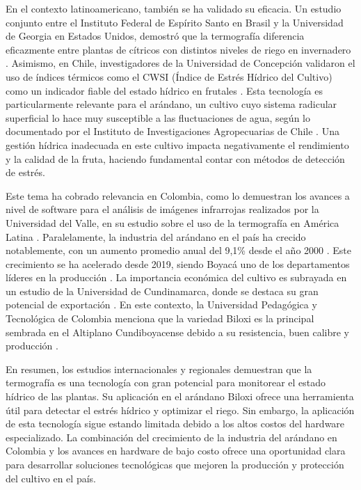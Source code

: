 En el contexto latinoamericano, también se ha validado su eficacia. Un estudio conjunto entre el Instituto Federal de Espírito Santo en Brasil y la Universidad de Georgia en Estados Unidos, demostró que la termografía diferencia eficazmente entre plantas de cítricos con distintos niveles de riego en invernadero . Asimismo, en Chile, investigadores de la Universidad de Concepción validaron el uso de índices térmicos como el CWSI (Índice de Estrés Hídrico del Cultivo) como un indicador fiable del estado hídrico en frutales . Esta tecnología es particularmente relevante para el arándano, un cultivo cuyo sistema radicular superficial lo hace muy susceptible a las fluctuaciones de agua, según lo documentado por el Instituto de Investigaciones Agropecuarias de Chile . Una gestión hídrica inadecuada en este cultivo impacta negativamente el rendimiento y la calidad de la fruta, haciendo fundamental contar con métodos de detección de estrés.

Este tema ha cobrado relevancia en Colombia, como lo demuestran los avances a nivel de software para el análisis de imágenes infrarrojas realizados por la Universidad del Valle, en su estudio sobre el uso de la termografía en América Latina . Paralelamente, la industria del arándano en el país ha crecido notablemente, con un aumento promedio anual del 9,1\% desde el año 2000 . Este crecimiento se ha acelerado desde 2019, siendo Boyacá uno de los departamentos líderes en la producción . La importancia económica del cultivo es subrayada en un estudio de la Universidad de Cundinamarca, donde se destaca su gran potencial de exportación . En este contexto, la Universidad Pedagógica y Tecnológica de Colombia menciona que la variedad Biloxi es la principal sembrada en el Altiplano Cundiboyacense debido a su resistencia, buen calibre y producción .

En resumen, los estudios internacionales y regionales demuestran que la termografía es una tecnología con gran potencial para monitorear el estado hídrico de las plantas. Su aplicación en el arándano Biloxi ofrece una herramienta útil para detectar el estrés hídrico y optimizar el riego. Sin embargo, la aplicación de esta tecnología sigue estando limitada debido a los altos costos del hardware especializado. La combinación del crecimiento de la industria del arándano en Colombia y los avances en hardware de bajo costo ofrece una oportunidad clara para desarrollar soluciones tecnológicas que mejoren la producción y protección del cultivo en el país.

